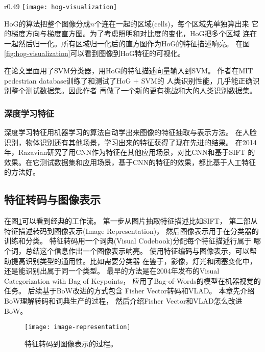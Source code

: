 \begin{wrapfigure}{r}{0.49\textwidth}
  \centering
    \captionsetup{justification=centering}
    \texttt{[image: hog-visualization]}
    \caption{可视化HOG的特征描述。\\
             源：Cornell CS4670}
  \label{fig:hog-visualization}
\end{wrapfigure}
HoG的算法把整个图像分成$n$个连在一起的区域(cells)，每个区域先单独算出来
它的梯度方向与梯度直方图。为了考虑照明和对比度的变化，HoG把多个区域
连在一起然后归一化。所有区域归一化后的直方图作为HoG的特征描述响亮。
在图\ref{fig:hog-visualization}可以看到图像到HoG特征的可视化。

在论文里面用了SVM分类器，用HoG的特征描述向量输入到SVM。
作者在MIT pedestrian database训练了和测试了HoG + SVM的
人类识别性能，几乎能正确识别整个测试数据集。因此作者
再做了一个新的更有挑战和大的人类识别数据集。


\subsubsection{深度学习特征}
深度学习特征用机器学习的算法自动学出来图像的特征抽取与表示方法。
在人脸识别，物体识别还有其他场景，学习出来的特征获得了现在先进的结果。
\cite{taigman2014deepface, krizhevsky2012imagenet}
在2014年，Razavian研究了用CNN作为特征在其他应用场景，对比CNN和基于SIFT
的效果。在它测试数据集和应用场景，基于CNN的特征的效果，都比基于人工特征的方法好。
\cite{razavian2014cnn}




\subsection{特征转码与图像表示}
\label{subsubsec:feature-encoding}
在图\ref{fig:image-representation}可以看到经典的工作流。
第一步从图片抽取特征描述比如SIFT，
第二部从特征描述转码到图像表示(Image Representation)，
然后图像表示用于在分类器的训练和分类。
特征转码用一个词典(Visual Codebook)分配每个特征描述行属于
哪个词，总结这个信息作出一个图像表示响亮。
使用特征编码与图像表示，可以帮助提高识别类型的通用性。比如需要分类器
在鉴于，影像，灯光和闭塞变化中，还是能识别出属于同一个类型。
最早的方法是在2004年发布的Visual Categorization with Bag of Keypoints，
应用了Bag-of-Words的模型在机器视觉的任务。\cite{csurka2004visual}
后续基于BoW改进的方式包含 Fisher Vector转码和VLAD。
\cite{perronnin2007fisher,jegou2010vlad}本章先介绍BoW理解转码和词典生产的过程，
然后介绍Fisher Vector和VLAD怎么改进BoW。
\begin{figure}
  \centering
    \texttt{[image: image-representation]}
    \caption{特征转码到图像表示的过程。}
  \label{fig:image-representation}
\end{figure}

